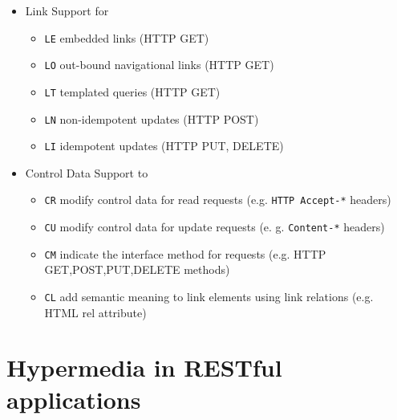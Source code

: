 \documentclass[12pt,a4paper]{scrartcl}		%
\begin{document}
\begin{itemize}
\item Link Support for
  \begin{itemize}
  \item \texttt{LE} embedded links (HTTP GET)
  \item \texttt{LO} out-bound navigational links (HTTP GET)
  \item \texttt{LT} templated queries (HTTP GET)
  \item \texttt{LN} non-idempotent updates (HTTP POST)
  \item \texttt{LI} idempotent updates (HTTP PUT, DELETE) 
  \end{itemize}
\item Control Data Support to
  \begin{itemize}
  \item \texttt{CR} modify control data for read requests (e.g. \texttt{HTTP Accept-*} headers)
  \item \texttt{CU} modify control data for update requests (e. g. \texttt{Content-*} headers)
  \item \texttt{CM} indicate the interface method for requests (e.g. HTTP GET,POST,PUT,DELETE methods)
  \item \texttt{CL} add semantic meaning to link elements using link relations (e.g. HTML rel attribute)
  \end{itemize}
\end{itemize}

\section{Hypermedia in RESTful applications}



\end{document}
